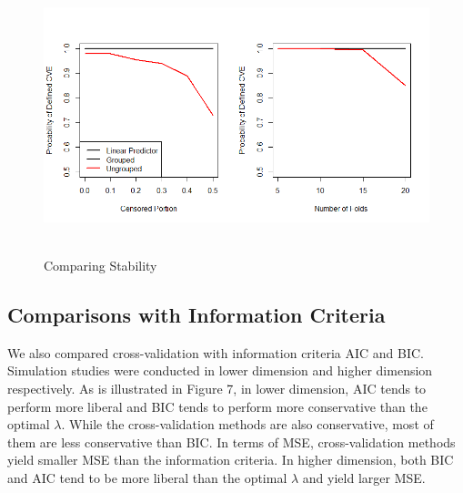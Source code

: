 \documentclass{article}\usepackage[]{graphicx}\usepackage[]{color}
\begin{document}
\begin{figure}
    \centering
		\includegraphics[height= 8cm ]{./figures/stability2.png}
    \caption{Comparing Stability}
\end{figure}	


    \subsection {Comparisons with Information Criteria}
    \par We also compared cross-validation with information criteria AIC and BIC. Simulation studies were conducted in lower dimension and higher dimension respectively. As is illustrated in Figure 7, in lower dimension, AIC tends to perform more liberal and BIC tends to perform more conservative than the optimal $\lambda$. While the cross-validation methods are also conservative, most of them are less conservative than BIC. In terms of MSE, cross-validation methods yield smaller MSE than the information criteria. In higher dimension, both BIC and AIC tend to be more liberal than the optimal $\lambda$ and yield larger MSE.
\end{document}
